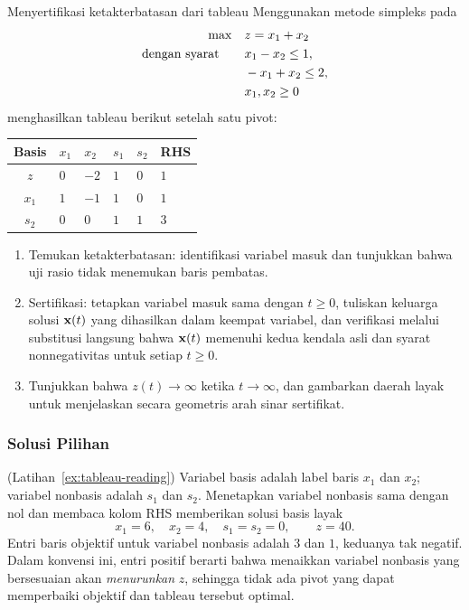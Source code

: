 \begin{ex}{Menyertifikasi ketakterbatasan dari tableau}{}
\label{ex:tableau-unbounded-certificate}
 Menggunakan metode simpleks pada
\[
\begin{aligned}
\max\quad & z = x_1 + x_2\\
\mbox{dengan syarat}\quad\quad  & x_1 - x_2  \le 1,\\
          & -x_1 + x_2 \le 2,\\
          & x_1, x_2 \ge 0
\end{aligned}
\]
menghasilkan tableau berikut setelah satu pivot:
\begin{center}
\renewcommand{\arraystretch}{1.3}
\begin{tabular}{c|ZZZZ|Z}
\toprule
Basis & $x_1$ & $x_2$ & $s_1$ & $s_2$ & RHS\\
\midrule
$z$   & $0$ & $-2$ & $1$ & $0$ & $1$\\
\midrule
$x_1$ & $1$ & $-1$ & $1$ & $0$ & $1$\\
$s_2$ & $0$ & $0$  & $1$ & $1$ & $3$\\
\bottomrule
\end{tabular}
\end{center}
\begin{enumerate}
\item Temukan ketakterbatasan: identifikasi variabel masuk dan tunjukkan bahwa uji rasio tidak menemukan baris pembatas.
\item Sertifikasi: tetapkan variabel masuk sama dengan $t \ge 0$, tuliskan keluarga solusi $\mathbf{x}(t)$ yang dihasilkan dalam keempat variabel, dan verifikasi melalui substitusi langsung bahwa $\mathbf{x}(t)$ memenuhi kedua kendala asli dan syarat nonnegativitas untuk setiap $t \ge 0$.
\item Tunjukkan bahwa $z(t) \to \infty$ ketika $t \to \infty$, dan gambarkan daerah layak untuk menjelaskan secara geometris arah sinar sertifikat.
\end{enumerate}
\end{ex}

\subsubsection*{Solusi Pilihan}

\begin{solution}(Latihan~\ref{ex:tableau-reading})
Variabel basis adalah label baris $x_1$ dan $x_2$; variabel nonbasis adalah
$s_1$ dan $s_2$. Menetapkan variabel nonbasis sama dengan nol dan membaca kolom
RHS memberikan solusi basis layak
\[
x_1 = 6, \quad x_2 = 4, \quad s_1 = s_2 = 0, \qquad z = 40.
\]
Entri baris objektif untuk variabel nonbasis adalah $3$ dan $1$, keduanya tak
negatif. Dalam konvensi ini, entri positif berarti bahwa menaikkan variabel
nonbasis yang bersesuaian akan \emph{menurunkan} $z$, sehingga tidak ada pivot
yang dapat memperbaiki objektif dan tableau tersebut optimal.
\end{solution}

